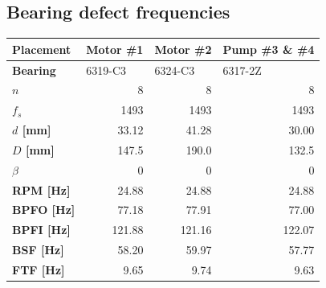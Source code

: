 \subsection{Bearing defect frequencies}
\begin{table}[h]
\centering
\begin{tabular}{|l|r|r|r|}
\hline
\textbf{Placement}     & \multicolumn{1}{l|}{\textbf{Motor \#1}} & \multicolumn{1}{l|}{\textbf{Motor \#2}} & \multicolumn{1}{l|}{\textbf{Pump \#3 \& \#4}} \\ \hline
\textbf{Bearing}       & \multicolumn{1}{l|}{6319-C3}            & \multicolumn{1}{l|}{6324-C3}            & \multicolumn{1}{l|}{6317-2Z}                  \\ \hline
\textbf{$n$}           & 8                                       & 8                                       & 8                                             \\ \hline
\textbf{$f_s$}         & 1493                                    & 1493                                    & 1493                                          \\ \hline
\textbf{$d$ {[}mm{]}}  & 33.12                                   & 41.28                                   & 30.00                                         \\ \hline
\textbf{$D$ {[}mm{]}}  & 147.5                                   & 190.0                                   & 132.5                                         \\ \hline
\textbf{$\beta$}       & 0                                       & 0                                       & 0                                             \\ \hline
\textbf{RPM {[}Hz{]}}  & 24.88                                   & 24.88                                   & 24.88                                         \\ \hline
\textbf{BPFO {[}Hz{]}} & 77.18                                   & 77.91                                   & 77.00                                         \\ \hline
\textbf{BPFI {[}Hz{]}} & 121.88                                  & 121.16                                  & 122.07                                        \\ \hline
\textbf{BSF {[}Hz{]}}  & 58.20                                   & 59.97                                   & 57.77                                         \\ \hline
\textbf{FTF {[}Hz{]}}  & 9.65                                    & 9.74                                    & 9.63                                          \\ \hline
\end{tabular}
\end{table}


